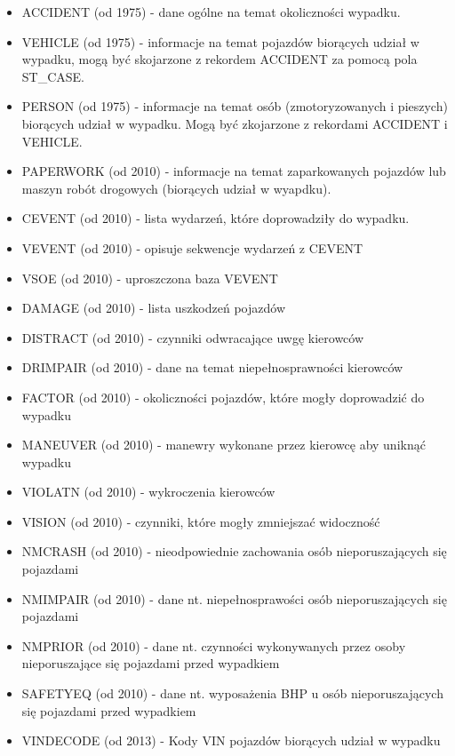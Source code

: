 \begin{itemize}
\itemsep-14pt\parskip0pt
\item
  ACCIDENT (od 1975) - dane ogólne na temat okoliczności wypadku.\\
\item
  VEHICLE (od 1975) - informacje na temat pojazdów biorących udział w
  wypadku, mogą być skojarzone z rekordem ACCIDENT za pomocą pola
  ST\_CASE.\\
\item
  PERSON (od 1975) - informacje na temat osób (zmotoryzowanych i
  pieszych) biorących udział w wypadku. Mogą być zkojarzone z rekordami
  ACCIDENT i VEHICLE.\\
\item
  PAPERWORK (od 2010) - informacje na temat zaparkowanych pojazdów lub
  maszyn robót drogowych (biorących udział w wyapdku).\\
\item
  CEVENT (od 2010) - lista wydarzeń, które doprowadziły do wypadku.\\
\item
  VEVENT (od 2010) - opisuje sekwencje wydarzeń z CEVENT\\
\item
  VSOE (od 2010) - uproszczona baza VEVENT\\
\item
  DAMAGE (od 2010) - lista uszkodzeń pojazdów\\
\item
  DISTRACT (od 2010) - czynniki odwracające uwgę kierowców\\
\item
  DRIMPAIR (od 2010) - dane na temat niepełnosprawności kierowców\\
\item
  FACTOR (od 2010) - okoliczności pojazdów, które mogły doprowadzić do
  wypadku\\
\item
  MANEUVER (od 2010) - manewry wykonane przez kierowcę aby uniknąć
  wypadku\\
\item
  VIOLATN (od 2010) - wykroczenia kierowców\\
\item
  VISION (od 2010) - czynniki, które mogły zmniejszać widoczność\\
\item
  NMCRASH (od 2010) - nieodpowiednie zachowania osób nieporuszających
  się pojazdami\\
\item
  NMIMPAIR (od 2010) - dane nt. niepełnosprawości osób nieporuszających
  się pojazdami\\
\item
  NMPRIOR (od 2010) - dane nt. czynności wykonywanych przez osoby
  nieporuszające się pojazdami przed wypadkiem\\
\item
  SAFETYEQ (od 2010) - dane nt. wyposażenia BHP u osób nieporuszających
  się pojazdami przed wypadkiem\\
\item
  VINDECODE (od 2013) - Kody VIN pojazdów biorących udział w wypadku
\end{itemize}

